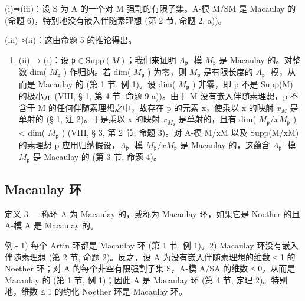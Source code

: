 (i)⇒(iii)：设 S 为 A 的一个对 M 强割的有限子集。A-模 M/SM 是 Macaulay 的 (命题 6)，特别地没有嵌入伴随素理想 (第 2 节, 命题 2, a))。

(iii)⇒(ii)：这由命题 5 的推论得出。

\begin{enumerate}
\def\labelenumi{(\roman{enumi})}
\setcounter{enumi}{1}
\tightlist
\item
  (ii) → (i)：设 \(\mathfrak{p} \in \text{Supp}(M)\)；我们来证明 \(A_{\mathfrak{p}}\) -模 \(M_{\mathfrak{p}}\) 是 Macaulay 的。对整数 dim( \(M_{\mathfrak{p}}\) ) 作归纳。若 dim( \(M_{\mathfrak{p}}\) ) 为零，则 \(M_{\mathfrak{p}}\) 是有限长度的 \(A_{\mathfrak{p}}\) -模，从而是 Macaulay 的 (第 1 节, 例 1)。设 dim( \(M_{\mathfrak{p}}\) ) 非零，即 p 不是 Supp(M) 的极小元 (VIII, § 1, 第 4 节, 命题 9 a))。由于 M 没有嵌入伴随素理想，p 不含于 M 的任何伴随素理想之中，故存在 p 的元素 x，使乘以 x 的映射 \(x_{M}\) 是单射的 (§ 1, 注 2)。于是乘以 x 的映射 \(x_{M_{\mathfrak{p}}}\) 是单射的，且有 dim( \(M_{\mathfrak{p}}/xM_{\mathfrak{p}}\) ) \textless{} dim( \(M_{\mathfrak{p}}\) ) (VIII, § 3, 第 2 节, 命题 3)。对 A-模 M/xM 以及 Supp(M/xM) 的素理想 p 应用归纳假设，\(A_{\mathfrak{p}}\) -模 \(M_{\mathfrak{p}}/xM_{\mathfrak{p}}\) 是 Macaulay 的，这蕴含 \(A_{\mathfrak{p}}\) -模 \(M_{\mathfrak{p}}\) 是 Macaulay 的 (第 3 节, 命题 4)。
\end{enumerate}

\subsection{Macaulay 环}

定义 3.--- 称环 A 为 Macaulay 的，或称为 Macaulay 环，如果它是 Noether 的且 A-模 A 是 Macaulay 的。

例.- 1) 每个 Artin 环都是 Macaulay 环 (第 1 节, 例 1)。2) Macaulay 环没有嵌入伴随素理想 (第 2 节, 命题 2)。反之，设 A 为没有嵌入伴随素理想的维数 ≤ 1 的 Noether 环；对 A 的每个非空有限强割子集 S，A-模 A/SA 的维数 ≤ 0，从而是 Macaulay 的 (第 1 节, 例 1)；因此 A 是 Macaulay 环 (第 4 节, 定理 2)。特别地，维数 ≤ 1 的约化 Noether 环是 Macaulay 环。

